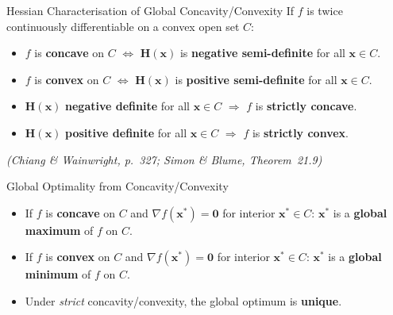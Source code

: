 \documentclass[12pt, a4paper]{article}
\theoremstyle{definition}
\newcommand{\bx}{\mathbf{x}}
\newcommand{\bz}{\mathbf{0}}
\newcommand{\bH}{\mathbf{H}}
\begin{document}
\begin{thmbox}{Hessian Characterisation of Global Concavity/Convexity}
If $f$ is twice continuously differentiable on a convex open set $C$:
\begin{itemize}
  \item $f$ is \textbf{concave} on $C$ $\iff$
        $\bH(\bx)$ is \textbf{negative semi-definite} for all $\bx \in C$.
  \item $f$ is \textbf{convex} on $C$ $\iff$
        $\bH(\bx)$ is \textbf{positive semi-definite} for all $\bx \in C$.
  \item $\bH(\bx)$ \textbf{negative definite} for all $\bx \in C$
        $\Rightarrow$ $f$ is \textbf{strictly concave}.
  \item $\bH(\bx)$ \textbf{positive definite} for all $\bx \in C$
        $\Rightarrow$ $f$ is \textbf{strictly convex}.
\end{itemize}
\emph{(Chiang \& Wainwright, p.\ 327; Simon \& Blume, Theorem~21.9)}
\end{thmbox}

\begin{thmbox}{Global Optimality from Concavity/Convexity}
\begin{itemize}
  \item If $f$ is \textbf{concave} on $C$ and $\nabla f(\bx^*) = \bz$
        for interior $\bx^* \in C$:
        $\bx^*$ is a \textbf{global maximum} of $f$ on $C$.
  \item If $f$ is \textbf{convex} on $C$ and $\nabla f(\bx^*) = \bz$
        for interior $\bx^* \in C$:
        $\bx^*$ is a \textbf{global minimum} of $f$ on $C$.
  \item Under \emph{strict} concavity/convexity, the global optimum is
        \textbf{unique}.
\end{itemize}
\end{thmbox}
\end{document}
